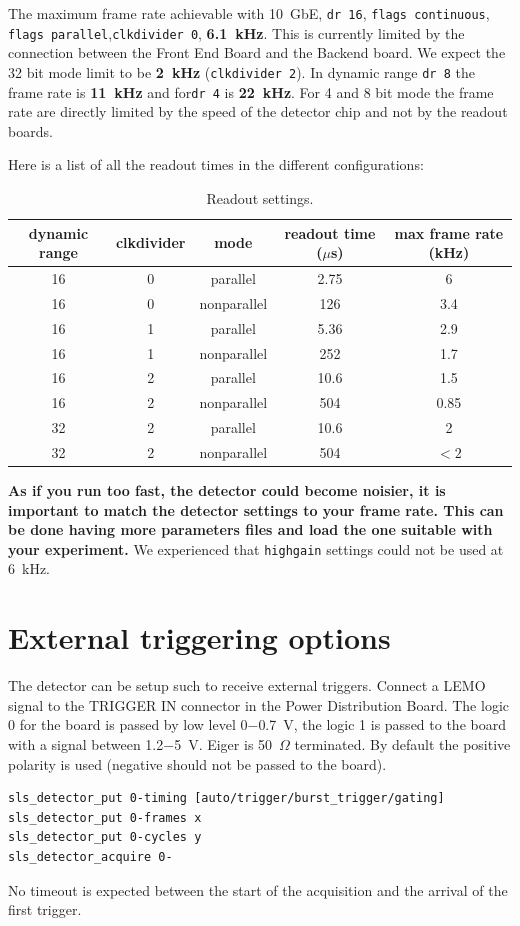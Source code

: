 \documentclass{article}
\begin{document}
The maximum frame rate achievable with 10~GbE, {\tt{dr 16}}, {\tt{flags continuous}}, {\tt{flags parallel}},{\tt{clkdivider 0}}, \textbf{6.1~kHz}. This is currently limited by the connection between the Front End Board and the Backend board. We expect the 32 bit mode limit to be \textbf{2~kHz} ({\tt{clkdivider 2}}).
 In dynamic range {\tt{dr 8}} the frame rate is \textbf{11~kHz} and for{\tt{dr 4}} is \textbf{22~kHz}. For 4 and 8 bit mode the frame rate are directly limited by the speed of the detector chip and not by the readout boards.    

Here is a list of all the readout times in the different configurations:
\begin{table}
\begin{tabular}{|c|c|c|c|c|}
\hline
dynamic range & clkdivider & mode & readout time ($\mu$s) & max frame rate (kHz)\\
\hline
16 & 0 & parallel & 2.75 & 6\\
\hline
16 & 0 & nonparallel &  126 & 3.4\\
\hline
16 & 1 & parallel &  5.36 & 2.9\\
\hline
16 & 1 & nonparallel & 252 & 1.7\\
\hline
16 & 2 & parallel &  10.6 & 1.5\\
\hline
16 & 2 & nonparallel & 504 & 0.85\\
\hline
32 & 2 & parallel &  10.6 & 2\\
\hline
32 & 2 & nonparallel & 504 & $<2$\\
\hline
\end{tabular}
\caption{Readout settings.}
\end{table}
\textbf{As if you run too fast, the detector could become noisier, it is important to match the detector settings to your frame rate. This can be done having more parameters files and load the one suitable with your experiment.} We experienced that {\tt{highgain}} settings could not be used at 6~kHz.


\section{External triggering options}
The detector can be setup such to receive external triggers. Connect a LEMO signal to the TRIGGER IN connector in the Power Distribution Board. The logic 0 for the board is passed by low level 0$-$0.7~V, the logic 1 is passed to the board with a signal between 1.2$-$5~V. Eiger is 50~$\Omega$ terminated. By default the positive polarity is used (negative should not be passed to the board).  
\begin{verbatim}
sls_detector_put 0-timing [auto/trigger/burst_trigger/gating]
sls_detector_put 0-frames x
sls_detector_put 0-cycles y
sls_detector_acquire 0-
\end{verbatim}
No timeout is expected between the start of the acquisition and the arrival of the first trigger. 
\end{document}
